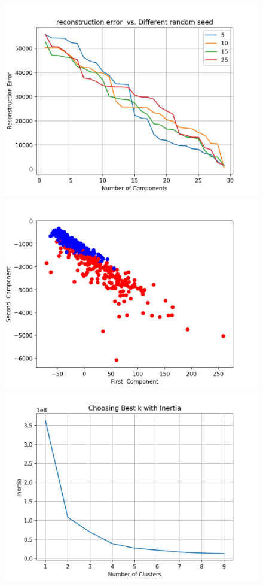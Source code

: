 \documentclass[a4paper,12pt]{article}
\begin{document}
\begin{figure}[!htb]
   \begin{minipage}{0.33\textwidth}
     \centering
     \includegraphics[width=.95\linewidth]{rp_dataset1}
   \end{minipage}\hfill
    \begin{minipage}{0.33\textwidth}
     \centering
     \includegraphics[width=.95\linewidth]{rp_dataset1_visual}
     \end{minipage}\hfill
     \begin{minipage}{0.33\textwidth}
     \centering
     \includegraphics[width=.95\linewidth]{rp_clustering_dataset1_inertia}

\end{minipage}
\end{figure}
\end{document}
